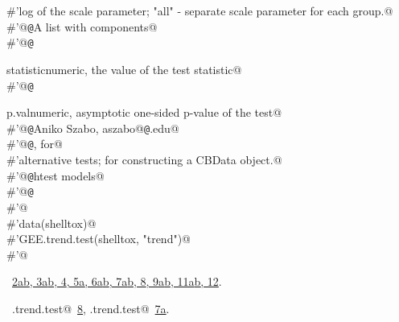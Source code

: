 \documentclass[reqno]{amsart}
\renewcommand{\NWlink}[2]{\hyperlink{#1}{#2}}
\begin{document}
\begin{flushleft}
\begin{list}{}{}
\mbox{}\verb@#'log of the scale parameter; "all" - separate scale parameter for each group.@\\
\mbox{}\verb@#'@{\tt @}\verb@return A list with components@\\
\mbox{}\verb@#'@{\tt @}\verb@return \item{statistic}{numeric, the value of the test statistic}@\\
\mbox{}\verb@#'@{\tt @}\verb@return \item{p.val}{numeric, asymptotic one-sided p-value of the test}@\\
\mbox{}\verb@#'@{\tt @}\verb@author Aniko Szabo, aszabo@{\tt @}\verb@mcw.edu@\\
\mbox{}\verb@#'@{\tt @}\verb@seealso {},  for@\\
\mbox{}\verb@#'alternative tests;  for constructing a CBData object.@\\
\mbox{}\verb@#'@{\tt @}\verb@keywords htest models@\\
\mbox{}\verb@#'@{\tt @}\verb@examples@\\
\mbox{}\verb@#'@\\
\mbox{}\verb@#'data(shelltox)@\\
\mbox{}\verb@#'GEE.trend.test(shelltox, "trend")@\\
\mbox{}\verb@#'@\\
\mbox{}\verb@@{\NWsep}
\end{list}
\vspace{-1.5ex}
\footnotesize
\begin{list}{}{\setlength{\itemsep}{-\parsep}\setlength{\itemindent}{-\leftmargin}}
\item \NWtxtFileDefBy\ \NWlink{nuweb2a}{2a}\NWlink{nuweb2b}{b}\NWlink{nuweb3a}{, 3a}\NWlink{nuweb3b}{b}\NWlink{nuweb4}{, 4}\NWlink{nuweb5a}{, 5a}\NWlink{nuweb6a}{, 6a}\NWlink{nuweb6b}{b}\NWlink{nuweb7a}{, 7a}\NWlink{nuweb7b}{b}\NWlink{nuweb8}{, 8}\NWlink{nuweb9a}{, 9a}\NWlink{nuweb9b}{b}\NWlink{nuweb11a}{, 11a}\NWlink{nuweb11b}{b}\NWlink{nuweb12}{, 12}.
\item \NWtxtIdentsUsed\nobreak\  \verb@GEE.trend.test@\nobreak\ \NWlink{nuweb8}{8}, \verb@RS.trend.test@\nobreak\ \NWlink{nuweb7a}{7a}.
\item{}
\end{list}
\vspace{4ex}
\end{flushleft}
\end{document}
